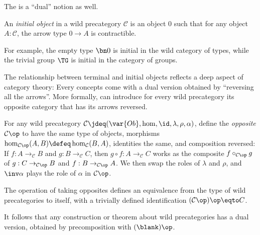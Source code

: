 The is a ``dual'' notion as well.
\begin{definition}
  An \emph{initial object}
  in a wild precategory $\mathcal C$ is an object $0$
  such that for any object $A:\mathcal C$,
  the arrow type $0\to A$ is contractible.
\end{definition}
For example, the empty type $\bn 0$ is initial in the wild category of types,
while the trivial group $\TG$ is initial in the category of groups.

The relationship between terminal and initial objects reflects
a deep aspect of category theory: Every concepts come with a dual version
obtained by ``reversing all the arrows''.
More formally, can introduce for every wild precategory its opposite category
that has its arrows reversed.
\begin{definition}
  For any wild precategory $\mathcal C\jdeq(\var{Ob},\hom,\id,\lambda,\rho,\alpha)$,
  define the \emph{opposite} $\mathcal C\op$
  to have the same type of objects,
  morphisms $\hom_{\mathcal C\op}(A,B) \defeq \hom_{\mathcal C}(B,A)$,
  identities the same, and composition reversed:
  If $f : A \to_{\mathcal C} B$ and $g : B \to_{\mathcal C} C$,
  then $g\circ f : A \to_{\mathcal C} C$ works
  as the composite $f \circ_{\mathcal C\op} g$ of $g : C \to_{\mathcal C\op} B$
  and $f : B \to_{\mathcal C\op} A$.
  We then swap the roles of $\lambda$ and $\rho$,
  and $\inv\alpha$ plays the role of $\alpha$ in $\mathcal C\op$.
\end{definition}
\begin{lemma}
  The operation of taking opposites defines an equivalence
  from the type of wild precategories to itself,
  with a trivially defined identification $(\mathcal C\op)\op \eqto C$.
\end{lemma}
It follows that any construction or theorem about wild precategories
has a dual version, obtained by precomposition with $(\blank)\op$.

